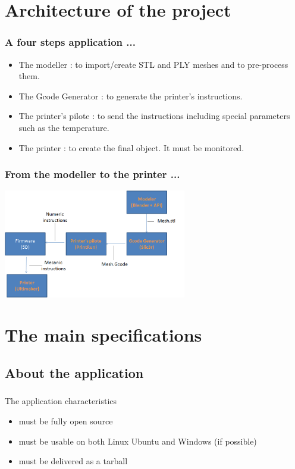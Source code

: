 \documentclass{beamer}
\begin{document}
\section{Architecture of the project}

\begin{frame}
	\frametitle{A four steps application ... }
	
	\begin{block}{}
	\begin{itemize}
	\item The modeller : to import/create STL and PLY meshes and to pre-process them.
	\item The Gcode Generator : to generate the printer's instructions.
	\item The printer's pilote : to send the instructions including special parameters such as the temperature.
	\item The printer : to create the final object. It must be monitored.
	\end{itemize}
	\end{block}
	
\end{frame}


\begin{frame}
	\frametitle{From the modeller to the printer ...}

    \begin{center}
		\includegraphics[width=8cm]{ARD1}	
	\end{center}
	
\end{frame}

\section{The main specifications}

\subsection{About the application}
\begin{frame}
	\frametitle{}
	 \begin{block}{The application characteristics}
		\begin{itemize}
			\item must be fully open source
			\item must be usable on both Linux Ubuntu and Windows (if possible)
			\item must be delivered as a tarball
		\end{itemize}
    \end{block}
\end{frame}
    
\end{document}
